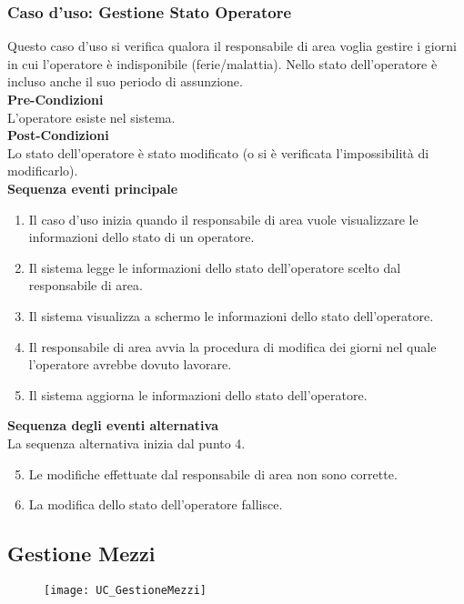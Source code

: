\documentclass[green, fancy, 11pt]{elegantbook}
\begin{document}
\subsubsection{Caso d'uso: Gestione Stato Operatore}
\noindent
Questo caso d’uso si verifica qualora il responsabile di area voglia gestire i giorni in cui l’operatore è indisponibile (ferie/malattia). Nello stato dell’operatore è incluso anche il suo periodo di assunzione.\\
\textbf{Pre-Condizioni}\\
L'operatore esiste nel sistema.\\
\textbf{Post-Condizioni}\\
Lo stato dell'operatore è stato modificato (o si è verificata l’impossibilità di modificarlo).\\
\textbf{Sequenza eventi principale}
\begin{enumerate}
	\item Il caso d’uso inizia quando il responsabile di area vuole visualizzare le informazioni dello stato di un operatore.
	\item Il sistema legge le informazioni dello stato dell’operatore scelto dal responsabile di area.
	\item Il sistema visualizza a schermo le informazioni dello stato dell’operatore.
	\item Il responsabile di area avvia la procedura di modifica dei giorni nel quale l’operatore avrebbe dovuto lavorare.
	\item Il sistema aggiorna le informazioni dello stato dell’operatore.
\end{enumerate}
\textbf{Sequenza degli eventi alternativa}\\
La sequenza alternativa inizia dal punto 4.
\begin{enumerate}
	\setcounter{enumi}{4}
	\item Le modifiche effettuate dal responsabile di area non sono corrette.
	\item La modifica dello stato dell'operatore fallisce.
\end{enumerate}
\newpage


\subsection{Gestione Mezzi}
\begin{figure}[H]
	\texttt{[image: UC\_GestioneMezzi]}
\end{figure}
\end{document}
